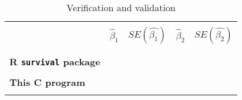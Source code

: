 \documentclass{article}
\begin{document}
\begin{table}[h!]
	\caption{Verification and validation}
	\centering
	\begin{tabular}{|l r r r r|}
		\hline
		& & & &\\
		& $\hat{\beta}_1$ & $SE(\hat{\beta_1})$ & $\hat{\beta}_2$ & $SE(\hat{\beta_2})$ \\
		& & & &\\
		\hline
		& & & &\\
		\textbf{R \texttt{survival} package}  &           & & &           \\
		& & & &\\
		\textbf{This C program}               &           & & &       \\
		& & & &\\
		\hline
	\end{tabular}
\end{table}
\end{document}
